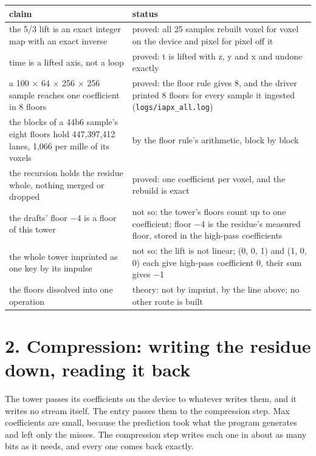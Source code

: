 {\small
\setlength{\tabcolsep}{6pt}
\begin{longtable}{>{\RaggedRight\arraybackslash}p{}>{\RaggedRight\arraybackslash}p{}}
\toprule
claim & status \\
\midrule
\endhead
the 5/3 lift is an exact integer map with an exact inverse & proved: all 25 samples rebuilt voxel for voxel on the device and pixel for pixel off it \\
time is a lifted axis, not a loop & proved: t is lifted with z, y and x and undone exactly \\
a 100 × 64 × 256 × 256 sample reaches one coefficient in 8 floors & proved: the floor rule gives 8, and the driver printed 8 floors for every sample it ingested (\texttt{logs/\allowbreak{}iapx\_\allowbreak{}all.\allowbreak{}log}) \\
the blocks of a 44b6 sample's eight floors hold 447,397,412 lanes, 1,066 per mille of its voxels & by the floor rule's arithmetic, block by block \\
the recursion holds the residue whole, nothing merged or dropped & proved: one coefficient per voxel, and the rebuild is exact \\
the drafts' floor −4 is a floor of this tower & not so: the tower's floors count up to one coefficient; floor −4 is the residue's measured floor, stored in the high-pass coefficients \\
the whole tower imprinted as one key by its impulse & not so: the lift is not linear; (0, 0, 1) and (1, 0, 0) each give high-pass coefficient 0, their sum gives −1 \\
the floors dissolved into one operation & theory: not by imprint, by the line above; no other route is built \\
\bottomrule
\end{longtable}
}

\section{\texorpdfstring{2. Compression: writing the residue down, reading it back}{2. Compression: writing the residue down, reading it back}}

The tower passes its coefficients on the device to whatever writes them, and it writes no stream itself. The entry passes them to the compression step. Max coefficients are small, because the prediction took what the program generates and left only the misses. The compression step writes each one in about as many bits as it needs, and every one comes back exactly.

